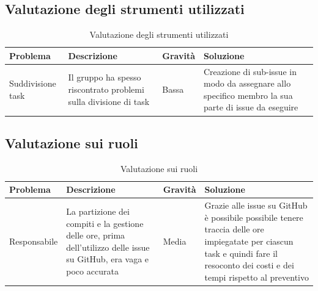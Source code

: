 \documentclass[a4paper,10pt]{article}
\begin{document}
\subsection{Valutazione degli strumenti utilizzati}
\begin{table}[H]
\centering
\renewcommand{\arraystretch}{1.2}
\begin{tabular}{|p{3cm}|p{4cm}|p{2cm}|p{4cm}|}
\hline
\textbf{Problema} & \textbf{Descrizione} & \textbf{Gravità} & \textbf{Soluzione} \\
\hline
Suddivisione task &
Il gruppo ha spesso riscontrato problemi sulla divisione di task &
Bassa &
Creazione di sub-issue in modo da assegnare allo specifico membro la sua parte di issue da eseguire \\
\hline
\end{tabular}
\caption{Valutazione degli strumenti utilizzati}
\label{tab:valutazione-strmenti}
\end{table}

\subsection{Valutazione sui ruoli}
\begin{table}[H]
\centering
\renewcommand{\arraystretch}{1.2}
\begin{tabular}{|p{3cm}|p{4cm}|p{2cm}|p{4cm}|}
\hline
\textbf{Problema} & \textbf{Descrizione} & \textbf{Gravità} & \textbf{Soluzione} \\
\hline
Responsabile &
La partizione dei compiti e la gestione delle ore, prima dell'utilizzo delle issue su GitHub, era vaga e poco accurata &
Media &
Grazie alle issue su GitHub è possibile possibile tenere traccia delle ore impiegatate per ciascun task e quindi fare il resoconto dei costi e dei tempi rispetto al preventivo \\
\hline
\end{tabular}
\caption{Valutazione sui ruoli}
\label{tab:valutazione-ruoli}
\end{table}
\end{document}
